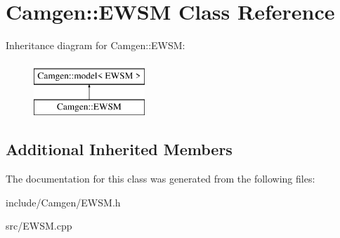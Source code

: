 \hypertarget{a00211}{\section{Camgen\-:\-:E\-W\-S\-M Class Reference}
\label{a00211}
}
Inheritance diagram for Camgen\-:\-:E\-W\-S\-M\-:\begin{figure}[H]
\begin{center}
\leavevmode
\includegraphics[height=2.000000cm]{a00211}
\end{center}
\end{figure}
\subsection*{Additional Inherited Members}


The documentation for this class was generated from the following files\-:\begin{DoxyCompactItemize}
\item 
include/\-Camgen/E\-W\-S\-M.\-h\item 
src/E\-W\-S\-M.\-cpp\end{DoxyCompactItemize}
